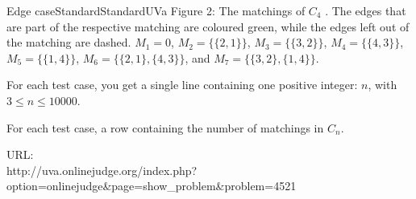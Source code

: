\begin{problema}{Edge case}{Standard}{Standard}{UVa}
Figure 2: The matchings of $C_4$ . The edges that are part of the respective matching are coloured green, while the edges left out of the matching are dashed. $M_1 = 0$, $M_2 = \{ \{2,1\} \}$, $M_3 = \{ \{3,2\} \}$, $M_4 = \{ \{4,3\} \}$, $M_5 = \{ \{1,4\} \}$, $M_6 = \{ \{2,1\}, \{4,3\} \}$, and $M_7 = \{ \{3,2\}, \{1,4\} \}$.


\InputFile

For each test case, you get a single line containing one positive integer: $n$, with $3 \leq n \leq 10000$. \\


\OutputFile

For each test case, a row containing the number of matchings in $C_n$.  \\


\Example




URL:\\ 
http://uva.onlinejudge.org/index.php? \\
option=onlinejudge\&page=show\_problem\&problem=4521

\end{problema}
